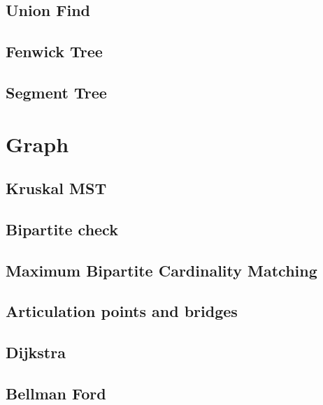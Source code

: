 \documentclass[twocolumn,8pt]{article}
\begin{document}
\subsection{Union Find}


\subsection{Fenwick Tree}


\subsection{Segment Tree}



\section{Graph}

\subsection{Kruskal MST}


\subsection{Bipartite check}


\subsection{Maximum Bipartite Cardinality Matching}


\subsection{Articulation points and bridges}


\subsection{Dijkstra}


\subsection{Bellman Ford}

\end{document}
